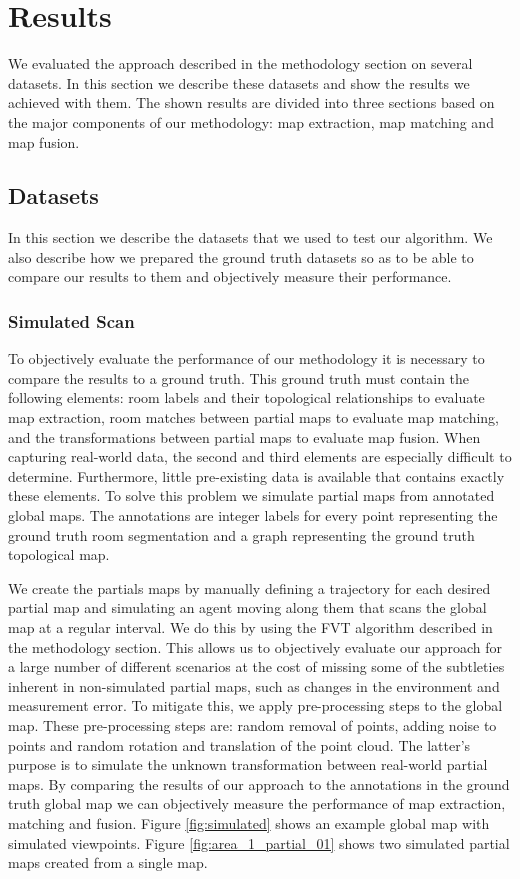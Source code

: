 \section{Results}
We evaluated the approach described in the methodology section on several datasets. In this section we describe these datasets and show the results we achieved with them. The shown results are divided into three sections based on the major components of our methodology: map extraction, map matching and map fusion. 

\subsection{Datasets}
In this section we describe the datasets that we used to test our algorithm. We also describe how we prepared the ground truth datasets so as to be able to compare our results to them and objectively measure their performance. 

\subsubsection{Simulated Scan}
To objectively evaluate the performance of our methodology it is necessary to compare the results to a ground truth. This ground truth must contain the following elements: room labels and their topological relationships to evaluate map extraction, room matches between partial maps to evaluate map matching, and the transformations between partial maps to evaluate map fusion. When capturing real-world data, the second and third elements are especially difficult to determine. Furthermore, little pre-existing data is available that contains exactly these elements. To solve this problem we simulate partial maps from annotated global maps. The annotations are integer labels for every point representing the ground truth room segmentation and a graph representing the ground truth topological map. 

We create the partials maps by manually defining a trajectory for each desired partial map and simulating an agent moving along them that scans the global map at a regular interval. We do this by using the FVT algorithm described in the methodology section. This allows us to objectively evaluate our approach for a large number of different scenarios at the cost of missing some of the subtleties inherent in non-simulated partial maps, such as changes in the environment and measurement error. To mitigate this, we apply pre-processing steps to the global map. These pre-processing steps are: random removal of points, adding noise to points and random rotation and translation of the point cloud. The latter's purpose is to simulate the unknown transformation between real-world partial maps. By comparing the results of our approach to the annotations in the ground truth global map we can objectively measure the performance of map extraction, matching and fusion. Figure \ref{fig:simulated} shows an example global map with simulated viewpoints. Figure \ref{fig:area_1_partial_01} shows two simulated partial maps created from a single map.

